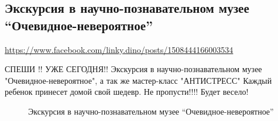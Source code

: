  
 

\subsection{Экскурсия в научно-познавательном музее ``Очевидное-невероятное''}
\url{https://www.facebook.com/linky.dino/posts/1508444166003534}


СПЕШИ !! УЖЕ СЕГОДНЯ!! Экскурсия в научно-познавательном музее
"Очевидное-невероятное", а так же мастер-класс "АНТИСТРЕСС" Каждый ребенок
принесет домой свой шедевр. Не пропусти!!!! Будет весело!
  
\begin{figure}[ht]
 \centering
 \caption{Экскурсия в научно-познавательном музее ``Очевидное-невероятное''}
 \label{fig:}
\end{figure}
